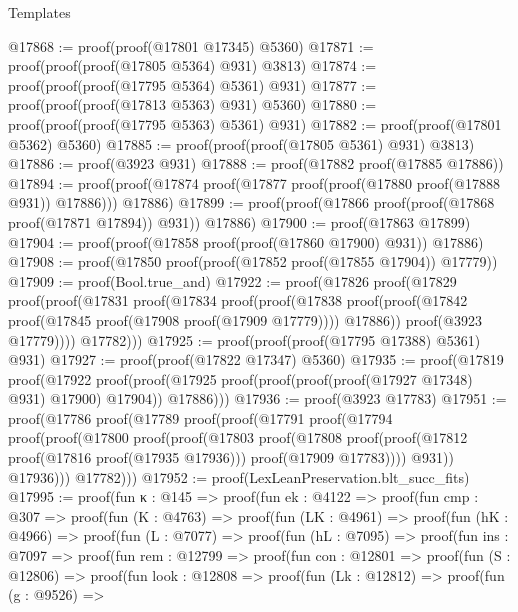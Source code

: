 \begin{lexlean}{Templates}
\begin{coremodule}
@17868 := proof(proof(@17801 @17345) @5360)
@17871 := proof(proof(proof(@17805 @5364) @931) @3813)
@17874 := proof(proof(proof(@17795 @5364) @5361) @931)
@17877 := proof(proof(proof(@17813 @5363) @931) @5360)
@17880 := proof(proof(proof(@17795 @5363) @5361) @931)
@17882 := proof(proof(@17801 @5362) @5360)
@17885 := proof(proof(proof(@17805 @5361) @931) @3813)
@17886 := proof(@3923 @931)
@17888 := proof(@17882 proof(@17885 @17886))
@17894 := proof(proof(@17874 proof(@17877 proof(proof(@17880 proof(@17888 @931)) @17886))) @17886)
@17899 := proof(proof(@17866 proof(proof(@17868 proof(@17871 @17894)) @931)) @17886)
@17900 := proof(@17863 @17899)
@17904 := proof(proof(@17858 proof(proof(@17860 @17900) @931)) @17886)
@17908 := proof(@17850 proof(proof(@17852 proof(@17855 @17904)) @17779))
@17909 := proof(Bool.true_and)
@17922 := proof(@17826
      proof(@17829
          proof(proof(@17831
                proof(@17834
                    proof(proof(@17838
                          proof(proof(@17842 proof(@17845 proof(@17908 proof(@17909 @17779))))
                              @17886))
                        proof(@3923 @17779))))
              @17782)))
@17925 := proof(proof(proof(@17795 @17388) @5361) @931)
@17927 := proof(proof(@17822 @17347) @5360)
@17935 := proof(@17819
      proof(@17922
          proof(proof(@17925 proof(proof(proof(proof(@17927 @17348) @931) @17900) @17904)) @17886)))
@17936 := proof(@3923 @17783)
@17951 := proof(@17786
      proof(@17789
          proof(proof(@17791
                proof(@17794
                    proof(proof(@17800
                          proof(proof(@17803
                                proof(@17808
                                    proof(proof(@17812 proof(@17816 proof(@17935 @17936)))
                                        proof(@17909 @17783))))
                              @931))
                        @17936)))
              @17782)))
@17952 := proof(LexLeanPreservation.blt_succ_fits)
@17995 := proof(fun {κ : @145} =>
    proof(fun {ek : @4122} =>
      proof(fun {cmp : @307} =>
        proof(fun (K : @4763) =>
          proof(fun (LK : @4961) =>
            proof(fun (hK : @4966) =>
              proof(fun (L : @7077) =>
                proof(fun (hL : @7095) =>
                  proof(fun {ins : @7097} =>
                    proof(fun {rem : @12799} =>
                      proof(fun {con : @12801} =>
                        proof(fun (S : @12806) =>
                          proof(fun {look : @12808} =>
                            proof(fun (Lk : @12812) =>
                              proof(fun (g : @9526) =>

\end{coremodule}
\end{lexlean}
